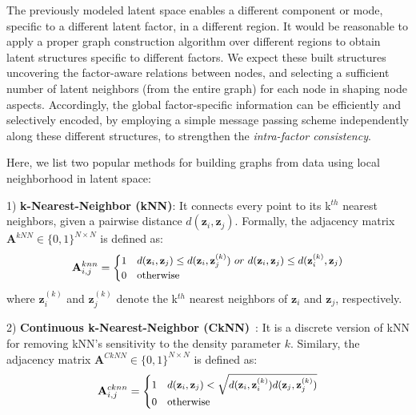 \documentclass[accepted]{uai2021} %
\begin{document}
The previously modeled latent space enables a different component or mode, specific to a different latent factor, in a different region. It would be reasonable to apply a proper graph construction algorithm over different regions to obtain latent structures specific to different factors. We expect these built structures uncovering the factor-aware relations between nodes, and selecting a sufficient number of latent neighbors (from the entire graph) for each node in shaping node aspects. Accordingly, the global factor-specific information can be efficiently and selectively encoded, by employing a simple message passing scheme independently along these different structures, to strengthen the \emph{intra-factor consistency}.

Here, we list two popular methods for building graphs from data using local neighborhood in latent space:

1) \textbf{k-Nearest-Neighbor (kNN)}: It connects every point to its k$^{th}$ nearest neighbors, given a pairwise distance $d(\mathbf{z}_i,\mathbf{z}_j)$. Formally, the adjacency matrix $\mathbf{A}^{kNN} \in \{0,1\}^{N \times N}$ is defined as:
\begin{equation*} \label{eq:cknn}
\small \mathbf{A}^{knn}_{i, j} = \begin{cases}
1 & d(\mathbf{z}_i,\mathbf{z}_j) \leq d(\mathbf{z}_i,\mathbf{z}_j^{(k)})\ or\ d(\mathbf{z}_i,\mathbf{z}_j) \leq d(\mathbf{z}_i^{(k)},\mathbf{z}_j)\\
0 & \text{otherwise}
\end{cases}
\end{equation*}
where $\mathbf{z}_i^{(k)}$ and $\mathbf{z}_j^{(k)}$ denote the k$^{th}$ nearest neighbors of $\mathbf{z}_i$ and $\mathbf{z}_j$, respectively.

2) \textbf{Continuous k-Nearest-Neighbor (CkNN)}~\citep{berry2016consistent}: It is a discrete version of kNN for removing kNN's sensitivity to the density parameter $k$. Similary, the adjacency matrix $\mathbf{A}^{CkNN} \in \{0,1\}^{N \times N}$ is defined as:
\begin{equation*} \label{eq:cknn}
\small \mathbf{A}^{cknn}_{i, j} = \begin{cases}
1 & d(\mathbf{z}_i,\mathbf{z}_j) < \sqrt{d(\mathbf{z}_i,\mathbf{z}_i^{(k)})d(\mathbf{z}_j,\mathbf{z}_j^{(k)})} \\
0 & \text{otherwise}
\end{cases}
\end{equation*}
\end{document}
